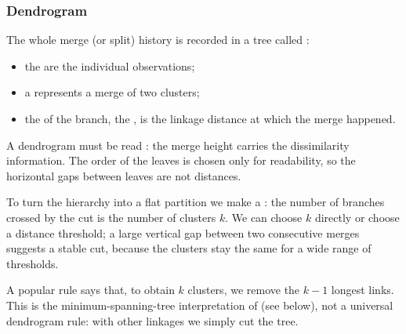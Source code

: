 \subsubsection{Dendrogram}

The whole merge (or split) history is recorded in a tree called :
\begin{itemize}
  \item the  are the individual observations;
  \item a  represents a merge of two clusters;
  \item the  of the branch, the , is the linkage distance at which the merge happened.
\end{itemize}
A dendrogram must be read : the merge height carries the dissimilarity information. The order of the leaves is chosen only for readability, so the horizontal gaps between leaves are not distances.

To turn the hierarchy into a flat partition we make a : the number of branches crossed by the cut is the number of clusters $k$. We can choose $k$ directly or choose a distance threshold; a large vertical gap between two consecutive merges suggests a stable cut, because the clusters stay the same for a wide range of thresholds.

\begin{center}
\end{center}

\begin{remark}
A popular rule says that, to obtain $k$ clusters, we remove the $k-1$ longest links. This is the minimum-spanning-tree interpretation of  (see below), not a universal dendrogram rule: with other linkages we simply cut the tree.
\end{remark}

